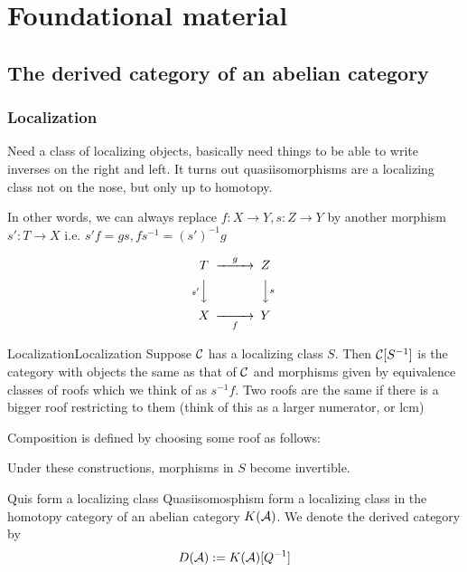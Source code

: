 \section{Foundational material}



\subsection{The derived category of an abelian category}
\subsubsection{Localization}

Need a class of localizing objects, basically need things to be able to write inverses on the right and left. It turns out quasiisomorphisms are a localizing class not on the nose, but only up to homotopy.

In other words, we can always replace $f:X\rightarrow Y, s:Z\rightarrow Y$ by another morphism $s':T\rightarrow X$ i.e.  $s'f=gs,fs^{-1}=(s')^{-1}g$

$$\begin{CD} T @>g>> Z \\ @Vs'VV @VVsV \\ X @> >f > Y\end{CD}$$

\begin{definition}{Localization}{Localization}
    Suppose $\mathcal{C}$ has a localizing class $S$. Then $\mathcal{C}[S^{-1}]$ is the category with objects the same as that of $\mathcal{C}$ and morphisms given by equivalence classes of roofs which we think of as $s^{-1}f$. Two roofs are the same if there is a bigger roof restricting to them (think of this as a larger numerator, or lcm)
\end{definition}

Composition is defined by choosing some roof as follows: 

Under these constructions, morphisms in $S$ become invertible.

\begin{theorem}{}{Quis form a localizing class}
    Quasiisomosphism form a localizing class in the homotopy category of an abelian category $K(\mathcal{A})$. We denote the derived category by$$D(\mathcal{A}):=K(\mathcal{A})[Q^{-1}]$$
\end{theorem}


